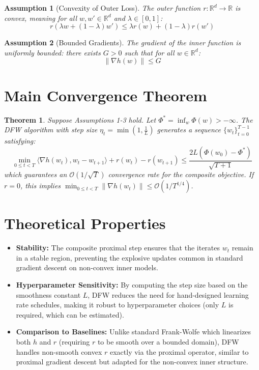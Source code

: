 \documentclass{article}
\newtheorem{assumption}{Assumption}
\newtheorem{theorem}{Theorem}
\begin{document}
\begin{assumption}[Convexity of Outer Loss]
The outer function $r: \mathbb{R}^d \to \mathbb{R}$ is convex, meaning for all $w, w' \in \mathbb{R}^d$ and $\lambda \in [0,1]$:
\begin{equation}
    r(\lambda w + (1-\lambda)w') \leq \lambda r(w) + (1-\lambda) r(w')
\end{equation}
\end{assumption}

\begin{assumption}[Bounded Gradients]
The gradient of the inner function is uniformly bounded: there exists $G > 0$ such that for all $w \in \mathbb{R}^d$:
\begin{equation}
    \|\nabla h(w)\| \leq G
\end{equation}
\end{assumption}

\section*{Main Convergence Theorem}
\begin{theorem}
Suppose Assumptions 1-3 hold. Let $\Phi^* = \inf_w \Phi(w) > -\infty$. The DFW algorithm with step size $\eta_t = \min\left(1, \frac{1}{L}\right)$ generates a sequence $\{w_t\}_{t=0}^{T-1}$ satisfying:
\begin{equation}
    \min_{0 \leq t < T} \langle \nabla h(w_t), w_t - w_{t+1} \rangle + r(w_t) - r(w_{t+1}) \leq \frac{2L (\Phi(w_0) - \Phi^*)}{\sqrt{T+1}}
\end{equation}
which guarantees an $\mathcal{O}(1/\sqrt{T})$ convergence rate for the composite objective. If $r=0$, this implies $\min_{0 \leq t < T} \|\nabla h(w_t)\| \leq \mathcal{O}(1/T^{1/4})$.
\end{theorem}

\section*{Theoretical Properties}
\begin{itemize}
    \item \textbf{Stability:} The composite proximal step ensures that the iterates $w_t$ remain in a stable region, preventing the explosive updates common in standard gradient descent on non-convex inner models.
    \item \textbf{Hyperparameter Sensitivity:} By computing the step size based on the smoothness constant $L$, DFW reduces the need for hand-designed learning rate schedules, making it robust to hyperparameter choices (only $L$ is required, which can be estimated).
    \item \textbf{Comparison to Baselines:} Unlike standard Frank-Wolfe which linearizes both $h$ and $r$ (requiring $r$ to be smooth over a bounded domain), DFW handles non-smooth convex $r$ exactly via the proximal operator, similar to proximal gradient descent but adapted for the non-convex inner structure.
\end{itemize}
\end{document}

